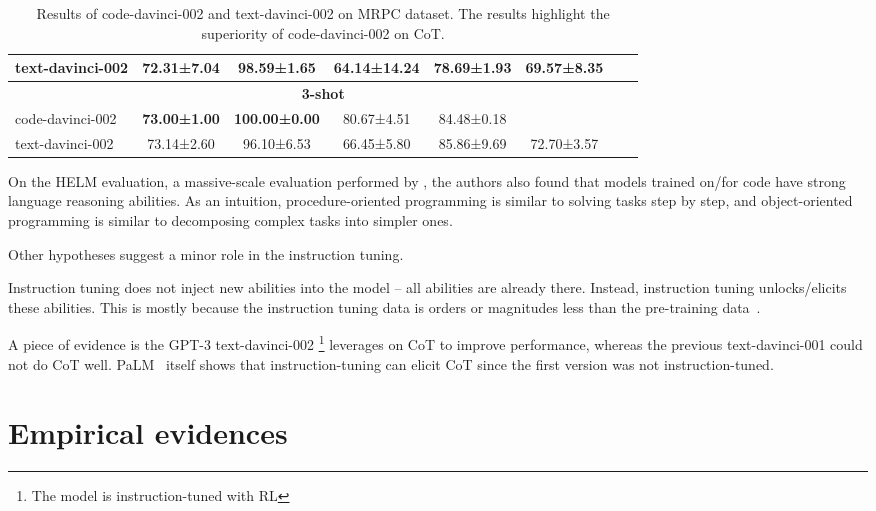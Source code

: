 \begin{table}[ht]
\begin{tabularx}{\textwidth}{Xccccccc}
		text-davinci-002 & 72.31±7.04                           & 98.59±1.65                           & 64.14±14.24                      & 78.69±1.93     & 69.57±8.35   &                &              \\
		\midrule
		\multicolumn{8}{c}{\textbf{3-shot}}                                                                                                                                                               \\
		\midrule
		code-davinci-002 & \textbf{73.00±1.00}                  & \textbf{100.00±0.00}                 & 80.67±4.51                       & 84.48±0.18     &              &                &              \\
		text-davinci-002 & 73.14±2.60                           & 96.10±6.53                           & 66.45±5.80                       & 85.86±9.69     & 72.70±3.57   &                &              \\
		\bottomrule
	\end{tabularx}
	\caption{Results of code-davinci-002 and text-davinci-002 on MRPC dataset. The results highlight the superiority of code-davinci-002 on CoT.}
	\label{tab:davinci-comparison}
\end{table}

On the HELM evaluation, a massive-scale evaluation performed by \textcite{liang2022holistic}, the authors also found that models trained on/for code have strong language reasoning abilities.
As an intuition, procedure-oriented programming is similar to solving tasks step by step, and object-oriented programming is similar to decomposing complex tasks into simpler ones.

Other hypotheses suggest a minor role in the instruction tuning.
\begin{displayquote}
	Instruction tuning does not inject new abilities into the model -- all abilities are already there.
	Instead, instruction tuning unlocks/elicits these abilities.
	This is mostly because the instruction tuning data is orders or magnitudes less than the pre-training data~\cite{fu2022gptroadmap}.
\end{displayquote}
A piece of evidence is the GPT-3 text-davinci-002 \footnote{The model is instruction-tuned with RL} leverages on CoT to improve performance, whereas the previous text-davinci-001 could not do CoT well.
PaLM~\cite{chowdhery2022palm} itself shows that instruction-tuning can elicit CoT since the first version was not instruction-tuned.

\section{Empirical evidences}
\label{sec:empirical-evidence}

